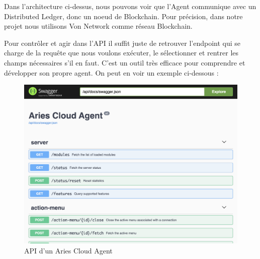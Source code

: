 \documentclass[12pt, openany]{report}
\begin{document}
\vspace{2mm}
Dans l'architecture ci-dessus, nous pouvons voir que l'Agent communique avec un Distributed Ledger, donc un noeud de Blockchain. Pour précision, dans notre projet nous utilisons Von Network comme réseau Blockchain.

\vspace{2mm}
Pour contrôler et agir dans l'API il suffit juste de retrouver l'endpoint qui se charge de la requête que nous voulons exécuter, le sélectionner et rentrer les champs nécessaires s'il en faut. C'est un outil très efficace pour comprendre et développer son propre agent. On peut en voir un exemple ci-dessous :\\
\begin{figure}[H]
\includegraphics[scale=0.17]{adminApi.png}
\centering
\caption{API d'un Aries Cloud Agent}
\end{figure}
\end{document}
